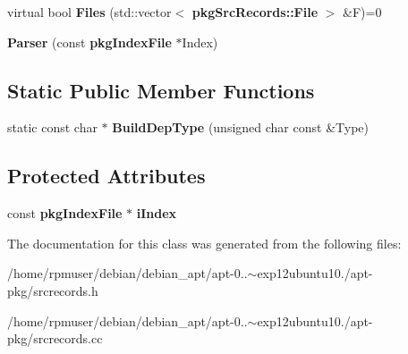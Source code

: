 \begin{DoxyCompactItemize}
\item 
virtual bool {\bfseries \-Files} (std\-::vector$<$ {\bf pkg\-Src\-Records\-::\-File} $>$ \&\-F)=0\label{classpkgSrcRecords_1_1Parser_a23ef9319da9fe64e010cc1cb3cb65642}

\item 
{\bfseries \-Parser} (const {\bf pkg\-Index\-File} $\ast$\-Index)\label{classpkgSrcRecords_1_1Parser_ad58d802b9e8baa3424c8a2851b886ba3}

\end{DoxyCompactItemize}
\subsection*{\-Static \-Public \-Member \-Functions}
\begin{DoxyCompactItemize}
\item 
static const char $\ast$ {\bfseries \-Build\-Dep\-Type} (unsigned char const \&\-Type)\label{classpkgSrcRecords_1_1Parser_a986a7256fa5cd957a409bbf613cf49a7}

\end{DoxyCompactItemize}
\subsection*{\-Protected \-Attributes}
\begin{DoxyCompactItemize}
\item 
const {\bf pkg\-Index\-File} $\ast$ {\bfseries i\-Index}\label{classpkgSrcRecords_1_1Parser_a4c8afaaf06415c382bc5f8db74644f6d}

\end{DoxyCompactItemize}


\-The documentation for this class was generated from the following files\-:\begin{DoxyCompactItemize}
\item 
/home/rpmuser/debian/debian\-\_\-apt/apt-\/0..$\sim$exp12ubuntu10./apt-\/pkg/srcrecords.\-h\item 
/home/rpmuser/debian/debian\-\_\-apt/apt-\/0..$\sim$exp12ubuntu10./apt-\/pkg/srcrecords.\-cc\end{DoxyCompactItemize}
